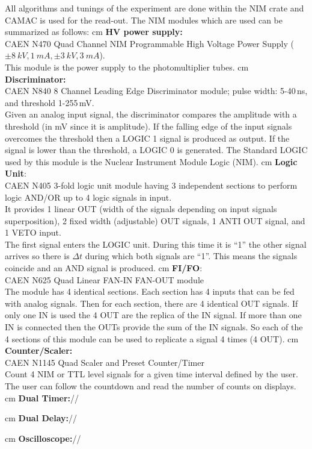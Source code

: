     All algorithms and tunings of the experiment are done within the NIM crate and CAMAC is used
    for the read-out. The NIM modules which are used can be summarized as follows: 
	 cm
	\textbf{HV power supply:}\\ CAEN N470 Quad Channel NIM Programmable High Voltage
    Power Supply ($\pm \SI{8}{kV}, \SI{1}{mA}, \pm \SI{3}{kV},  \SI{3}{mA}$).\\
	This module is the power supply to the photomultiplier tubes.
	 cm
	\textbf{Discriminator:}\\ CAEN N840 8 Channel Leading Edge Discriminator module; pulse width:
    5-40\,ns, and threshold 1-255\,mV.\\
	Given an analog input signal, the discriminator compares the amplitude with a threshold 
    (in mV since it is amplitude). If the falling edge of the input signals overcomes the threshold
    then a LOGIC 1 signal is produced as output. If the signal is lower than the threshold,
    a LOGIC 0 is generated. The Standard LOGIC used by this module is the Nuclear Instrument
    Module Logic (NIM).
	 cm
	\textbf{Logic Unit}:\\ CAEN N405 3-fold logic unit module having 3 independent sections to
    perform logic AND/OR up to 4 logic signals in input.\\
	It provides 1 linear OUT (width of the signals depending on input signals superposition),
    2 ﬁxed width (adjustable) OUT signals, 1 ANTI OUT signal, and 1 VETO input.\\
	The ﬁrst signal enters the LOGIC unit. During this time it is “1” the other signal arrives
    so there is $\Delta t$ during which both signals are “1”. 
    This means the signals coincide and an AND signal is produced.
	 cm
	\textbf{FI/FO}:\\ CAEN N625 Quad Linear FAN-IN FAN-OUT module\\
	The module has 4 identical sections. Each section has 4 inputs that can be fed with analog
    signals. Then for each section, there are 4 identical OUT signals. If only one IN is used the
    4 OUT are the replica of the IN signal. If more than one IN is connected then the OUTs provide
    the sum of the IN signals. So each of the 4 sections of this module can be used to replicate 
    a signal 4 times (4 OUT).
	 cm
	\textbf{Counter/Scaler:}\\ CAEN N1145 Quad Scaler and Preset Counter/Timer\\
	Count 4 NIM or TTL level signals for a given time interval deﬁned by the user.
    The user can follow the countdown and read the number of counts on displays.
    	 cm
	\textbf{Dual Timer:}//
	
	 cm
	\textbf{Dual Delay:}//
	
	 cm
	\textbf{Oscilloscope:}//
